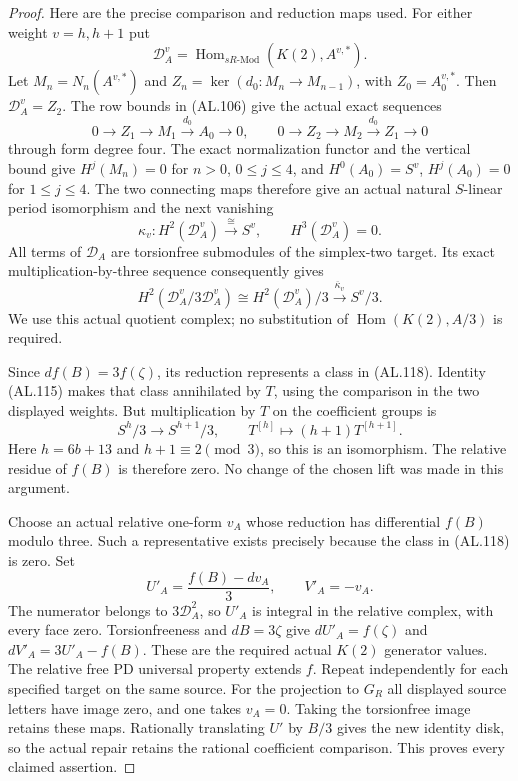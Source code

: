 \begin{proof}
Here are the precise comparison and reduction maps used.
For either weight $v=h,h+1$ put
\[
 \mathcal D_A^v=\operatorname{Hom}_{sR\text{-}\mathrm{Mod}}
                      (K(2),A^{v,*}).
\]
Let $M_n=N_n(A^{v,*})$ and $Z_n=\ker(d_0:M_n\to M_{n-1})$,
with $Z_0=A_0^{v,*}$. Then $\mathcal D_A^v=Z_2$.
The row bounds in (AL.106) give the actual exact sequences
\[
       0\longrightarrow Z_1\longrightarrow M_1
         \xrightarrow{d_0}A_0\longrightarrow0,
 \qquad
       0\longrightarrow Z_2\longrightarrow M_2
         \xrightarrow{d_0}Z_1\longrightarrow0
 \tag{AL.116}
\]
through form degree four. The exact normalization functor
and the vertical bound give $H^j(M_n)=0$ for $n>0$,
$0\leq j\leq4$, and $H^0(A_0)=S^v$,
$H^j(A_0)=0$ for $1\leq j\leq4$.
The two connecting maps therefore give an actual natural
$S$-linear period isomorphism and the next vanishing
\[
 \kappa_v:H^2(\mathcal D_A^v)\xrightarrow{\ \cong\ }S^v,
                 \qquad H^3(\mathcal D_A^v)=0.
 \tag{AL.117}
\]
All terms of $\mathcal D_A$ are torsionfree submodules
of the simplex-two target. Its exact multiplication-by-three
sequence consequently gives
\[
 H^2(\mathcal D_A^v/3\mathcal D_A^v)
          \cong H^2(\mathcal D_A^v)/3
          \xrightarrow{\ \overline\kappa_v\ } S^v/3.
 \tag{AL.118}
\]
We use this actual quotient complex; no substitution of
$\operatorname{Hom}(K(2),A/3)$ is required.

Since $df(B)=3f(\zeta)$, its reduction represents a class
in (AL.118). Identity (AL.115) makes that class annihilated
by $T$, using the comparison in the two displayed weights.
But multiplication by $T$ on the coefficient groups is
\[
 S^h/3\longrightarrow S^{h+1}/3,\qquad
              T^{[h]}\longmapsto(h+1)T^{[h+1]}.
 \tag{AL.119}
\]
Here $h=6b+13$ and $h+1\equiv2\pmod3$, so this is an
isomorphism. The relative residue of $f(B)$ is therefore zero.
No change of the chosen lift was made in this argument.

Choose an actual relative one-form $v_A$ whose reduction
has differential $f(B)$ modulo three. Such a representative
exists precisely because the class in (AL.118) is zero.
Set
\[
           U'_A=\frac{f(B)-dv_A}{3},\qquad V'_A=-v_A.
 \tag{AL.120}
\]
The numerator belongs to $3\mathcal D_A^2$, so $U'_A$
is integral in the relative complex, with every face zero.
Torsionfreeness and $dB=3\zeta$ give
$dU'_A=f(\zeta)$ and $dV'_A=3U'_A-f(B)$.
These are the required actual $K(2)$ generator values.
The relative free PD universal property extends $f$.
Repeat independently for each specified target on the
same source. For the projection to $G_R$ all displayed
source letters have image zero, and one takes $v_A=0$.
Taking the torsionfree image retains these maps.
Rationally translating $U'$ by $B/3$ gives the new identity
disk, so the actual repair retains the rational coefficient
comparison. This proves every claimed assertion.
\end{proof}

